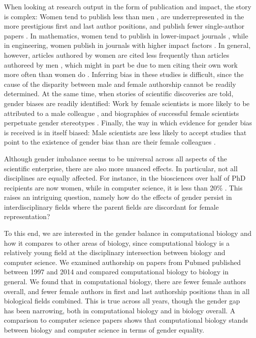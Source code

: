 \documentclass[10pt,letterpaper]{article}
\begin{document}
\begin{flushleft}
When looking at research output in the form of publication and impact, the story is complex: Women tend to publish less than men \cite{Lariviere2013}, are underrepresented in the more prestigious first and last author positions, and publish fewer single-author papers \cite{West2013}. In mathematics, women tend to publish in lower-impact journals \cite{Mihaljevic-Brandt2016}, while in engineering, women publish in journals with higher impact factors \cite{Ghiasi2015}. In general, however, articles authored by women are cited less frequently than articles authoreed by men \cite{Lariviere2013,Ghiasi2016}, which might in part be due to men citing their own work more often than women do \cite{King2016}. Inferring bias in these studies is difficult, since the cause of the disparity between male and female authorship cannot be readily determined. At the same time, when stories of scientific discoveries are told, gender biases are readily identified: Work by female scientists is more likely to be attributed to a male colleague \cite{Rossiter1993}, and biographies of successful female scientists perpetuate gender stereotypes \cite{Fara2013}. Finally, the way in which evidence for gender bias is received is in itself biased:  Male scientists are less likely to accept studies that point to the existence of gender bias than are their female colleagues \cite{Handley2015}.

Although gender imbalance seems to be universal across all aspects of the scientific enterprise, there are also more nuanced effects. In particular, not all disciplines are equally affected. For instance, in the biosciences over half of PhD recipients are now women, while in computer science, it is less than 20\% \cite{NSF2015}. This raises an intriguing question, namely how do the effects of gender persist in interdisciplinary fields where the parent fields are discordant for female representation?

To this end, we are interested in the gender balance in computational biology and how it compares to other areas of biology, since computational biology is a relatively young field at the disciplinary intersection between biology and computer science. We examined authorship on papers from Pubmed published between 1997 and 2014 and compared computational biology to biology in general. We found that in computational biology, there are fewer female authors overall, and fewer female authors in first and last authorship positions than in all biological fields combined. This is true across all years, though the gender gap has been narrowing, both in computational biology and in biology overall. A comparison to computer science papers shows that computational biology stands between biology and computer science in terms of gender equality.


\end{flushleft}
\end{document}
